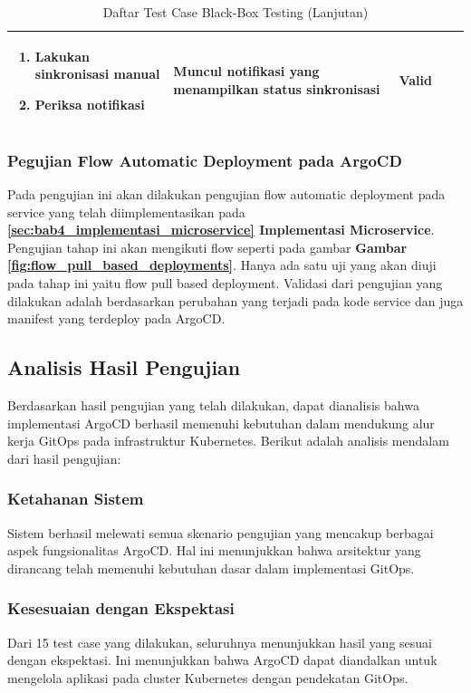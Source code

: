 \begin{table}[H]
\begin{adjustbox}{width=\textwidth}
\begin{tabular}{|p{0.8cm}|p{2.2cm}|p{4cm}|p{3.5cm}|p{1.2cm}|}
\begin{enumerate}[leftmargin=*,noitemsep,topsep=0pt,label=\arabic*.,widest=99]
                                                      \item Lakukan sinkronisasi manual
                                                      \item Periksa notifikasi
                                                    \end{enumerate}       & Muncul notifikasi yang menampilkan status sinkronisasi       & Valid                                                             \\ \hline
    \end{tabular}
  \end{adjustbox}
  \caption{Daftar Test Case Black-Box Testing (Lanjutan)}
  \label{tab:test-case-2}
\end{table}

\subsubsection{Pegujian Flow Automatic Deployment pada ArgoCD}
Pada pengujian ini akan dilakukan pengujian flow automatic deployment pada
service yang telah diimplementasikan pada
\textbf{\ref{sec:bab4_implementasi_microservice} Implementasi Microservice}.
Pengujian tahap ini akan mengikuti flow seperti pada gambar \textbf{Gambar
  \ref{fig:flow_pull_based_deployments}}. Hanya ada satu uji yang akan diuji pada
tahap ini yaitu flow pull based deployment. Validasi dari pengujian yang
dilakukan adalah berdasarkan perubahan yang terjadi pada kode service dan juga
manifest yang terdeploy pada ArgoCD.

\subsection{Analisis Hasil Pengujian}\label{subsec:analisis_hasil}
Berdasarkan hasil pengujian yang telah dilakukan, dapat dianalisis bahwa
implementasi ArgoCD berhasil memenuhi kebutuhan dalam mendukung alur kerja
GitOps pada infrastruktur Kubernetes. Berikut adalah analisis mendalam dari
hasil pengujian:

\subsubsection{Ketahanan Sistem}
Sistem berhasil melewati semua skenario pengujian yang mencakup berbagai aspek
fungsionalitas ArgoCD. Hal ini menunjukkan bahwa arsitektur yang dirancang
telah memenuhi kebutuhan dasar dalam implementasi GitOps.

\subsubsection{Kesesuaian dengan Ekspektasi}
Dari 15 test case yang dilakukan, seluruhnya menunjukkan hasil yang sesuai
dengan ekspektasi. Ini menunjukkan bahwa ArgoCD dapat diandalkan untuk
mengelola aplikasi pada cluster Kubernetes dengan pendekatan GitOps.

